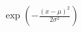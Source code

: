 \documentclass[preview]{standalone}
\begin{document}
\begin{align*}
\exp\left(-\frac{(x - \mu)^2}{2 \sigma^2}\right)
\end{align*}
\end{document}
